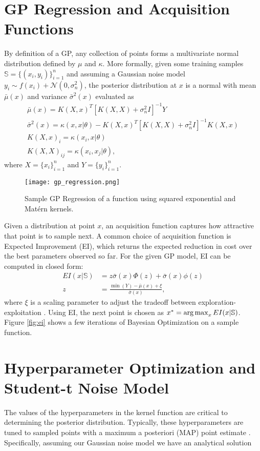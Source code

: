 \section{GP Regression and Acquisition Functions}
\label{gp_acq}
By definition of a GP, any collection of points forms a multivariate normal distribution defined by $\mu$ and $\kappa$. More formally, given some training samples $\mathbb{S} = \{(x_i, y_i)\}_{i=1}^n$ and assuming a Gaussian noise model $y_i \sim f(x_i) + \mathcal{N}(0, \sigma_n^2)$, the posterior distribution at $x$ is a normal with mean $\bar{\mu}(x)$ and variance $\bar{\sigma}^2(x)$ evaluated as
\begin{gather}
  \bar{\mu}(x) = K(X, x)^T[K(X, X) + \sigma_n^2 I]^{-1}Y \\
  \bar{\sigma}^2(x) = \kappa(x, x\vert \theta) - K(X, x)^T[K(X,X) + \sigma_n^2 I]^{-1}K(X,x) \\
  K(X,x)_i = \kappa(x_i, x\vert \theta) \nonumber\\
  K(X,X)_{ij} = \kappa(x_i, x_j\vert \theta) \nonumber,
\end{gather}
where $X = \{x_i\}_{i=1}^n$ and $Y = \{y_i\}_{i=1}^n$. 
\begin{figure}[t]
\centering
\texttt{[image: gp\_regression.png]}
\caption{Sample GP Regression of a function using squared exponential and Matérn kernels.}
\label{fig:gp_regression}
\end{figure}

Given a distribution at point $x$, an acquisition function captures how attractive that point is to sample next. A common choice of acquisition function is Expected Improvement (EI), which returns the expected reduction in cost over the best parameters observed so far. For the given GP model, EI can be computed in closed form: 
\begin{align}
  EI(x\vert \mathbb{S}) &= z\bar{\sigma}(x)\Phi(z) + \bar{\sigma}(x)\phi(z) \\
  z &= \frac{\min(Y) - \bar{\mu}(x) + \xi}{\bar{\sigma}(x)}\nonumber,
\end{align}
where $\xi$ is a scaling parameter to adjust the tradeoff between exploration-exploitation \citep{Lizotte:2008:PBO:1626686}. Using EI, the next point is chosen as $x^* = \operatorname*{arg\,max}_{x} EI(x \vert \mathbb{S})$. Figure \ref{fig:ei} shows a few iterations of Bayesian Optimization on a sample function.

\section{Hyperparameter Optimization and Student-t Noise Model}
\label{gp_hyperparam}
The values of the hyperparameters in the kernel function are critical to determining the posterior distribution. Typically, these hyperparameters are tuned to sampled points with a maximum a posteriori (MAP) point estimate \citep{NIPS2012_4522,GPstuff}. Specifically, assuming our Gaussian noise model we have an analytical solution

